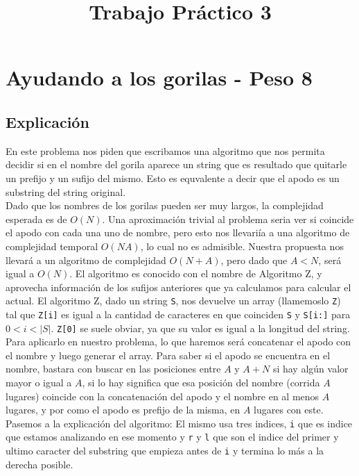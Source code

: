 \documentclass[a4paper]{article}
\title{Trabajo Práctico 3}
\author{}
\begin{document}
\maketitle

\section{Ayudando a los gorilas - Peso 8}
\subsection{Explicación}
En este problema nos piden que escribamos una algoritmo que nos permita decidir si en el nombre del gorila aparece un string que es resultado que quitarle un prefijo y un sufijo del mismo. Esto es equvalente a decir que el apodo es un substring del string original.\\
Dado que los nombres de los gorilas pueden ser muy largos, la complejidad esperada es de $O(N)$. Una aproximaci\'on trivial al problema seria ver si coincide el apodo con cada una uno de nombre, pero esto nos llevari\'ia a una algoritmo de complejidad temporal $O(NA)$, lo cual no es admisible. Nuestra propuesta nos llevar\'a a un algoritmo de complejidad $O(N+A)$, pero dado que $A < N$, ser\'a igual a $O(N)$. El algoritmo es conocido con el nombre de Algoritmo Z, y aprovecha informaci\'on de los sufijos anteriores que ya calculamos para calcular el actual.
El algoritmo Z, dado un string {\tt S}, nos devuelve un array (llamemoslo {\tt Z}) tal que {\tt Z[i]} es igual a la cantidad de caracteres en que coinciden {\tt S} y {\tt S[i:]} para $0 < i < |S|$. {\tt Z[0]} se suele obviar, ya que su valor es igual a la longitud del string.\\
Para aplicarlo en nuestro problema, lo que haremos ser\'a concatenar el apodo con el nombre y luego generar el array. Para saber si el apodo se encuentra en el nombre, bastara con buscar en las posiciones entre $A$ y $A+N$ si hay alg\'un valor mayor o igual a $A$, si lo hay significa que esa posici\'on del nombre (corrida $A$ lugares) coincide con la concatenaci\'on del apodo y el nombre en al menos $A$ lugares, y por como el apodo es prefijo de la misma, en $A$ lugares con este.\\
Pasemos a la explicaci\'on del algoritmo: El mismo usa tres indices, 
{\tt i} que es indice que estamos analizando en ese momento y {\tt r} y {\tt l} que son el indice del primer y ultimo caracter del substring que empieza antes de {\tt i} y termina lo m\'as a la derecha posible. \\
\end{document}
